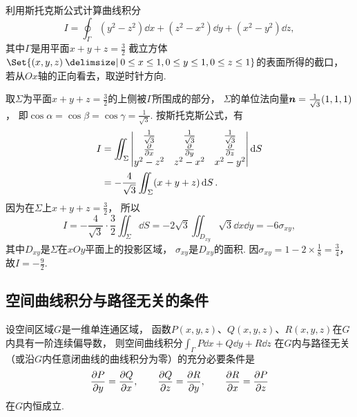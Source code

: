 \begin{example}
利用斯托克斯公式计算曲线积分\begin{equation*}
	I = \oint_\Gamma (y^2-z^2)\dd{x}+(z^2-x^2)\dd{y}+(x^2-y^2)\dd{z},
\end{equation*}
其中\(\Gamma\)是用平面\(x+y+z=\frac32\)
截立方体\(\Set{(x,y,z)\given0\leq x\leq1,0\leq y\leq1,0\leq z\leq1}\)的表面所得的截口，
若从\(Ox\)轴的正向看去，取逆时针方向.
\begin{solution}
取\(\Sigma\)为平面\(x+y+z=\frac32\)的上侧被\(\Gamma\)所围成的部分，
\(\Sigma\)的单位法向量\(\boldsymbol{n}=\frac1{\sqrt3}(1,1,1)\)，
即\(\cos\alpha=\cos\beta=\cos\gamma=\frac1{\sqrt3}\).
按斯托克斯公式，有\begin{align*}
	I &= \iint_\Sigma \begin{vmatrix}
		\frac1{\sqrt3} & \frac1{\sqrt3} & \frac1{\sqrt3} \\
		\pdv{x} & \pdv{y} & \pdv{z} \\
		y^2-z^2 & z^2-x^2 & x^2-y^2
	\end{vmatrix} \dd{S} \\
	&= -\frac4{\sqrt3} \iint_\Sigma (x+y+z) \dd{S}.
\end{align*}
因为在\(\Sigma\)上\(x+y+z=\frac32\)，
所以\begin{equation*}
	I = -\frac4{\sqrt3} \cdot \frac32 \iint_\Sigma \dd{S}
	= -2\sqrt3 \iint_{D_{xy}} \sqrt3 \dd{x}\dd{y}
	= -6 \sigma_{xy},
\end{equation*}
其中\(D_{xy}\)是\(\Sigma\)在\(xOy\)平面上的投影区域，
\(\sigma_{xy}\)是\(D_{xy}\)的面积.
因\(\sigma_{xy} = 1-2\times\frac18=\frac34\)，
故\(I=-\frac92\).
\end{solution}
\end{example}

\subsection{空间曲线积分与路径无关的条件}
\begin{theorem}\label{theorem:线积分与面积分.空间曲线积分与路径无关的条件}
设空间区域\(G\)是一维单连通区域，
函数\(P(x,y,z)\)、\(Q(x,y,z)\)、\(R(x,y,z)\)在\(G\)内具有一阶连续偏导数，
则空间曲线积分\(\int_\Gamma P\dd{x}+Q\dd{y}+R\dd{z}\)
在\(G\)内与路径无关（或沿\(G\)内任意闭曲线的曲线积分为零）的充分必要条件是\begin{equation*}
	\pdv{P}{y}=\pdv{Q}{x}, \qquad
	\pdv{Q}{z}=\pdv{R}{y}, \qquad
	\pdv{R}{x}=\pdv{P}{z}
\end{equation*}在\(G\)内恒成立.
\end{theorem}

